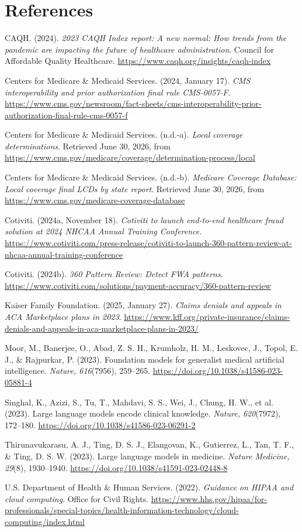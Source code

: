 \documentclass[11pt]{article}
\newcommand{\APARef}[1]{%
\hangindent=0.5in
\hangafter=1
#1\par
}
\begin{document}
\section*{References}
\APARef{
CAQH. (2024). \textit{2023 CAQH Index report: A new normal: How trends from the pandemic are impacting the future of healthcare administration}. Council for Affordable Quality Healthcare. \url{https://www.caqh.org/insights/caqh-index}
}
\APARef{
Centers for Medicare \& Medicaid Services. (2024, January 17). \textit{CMS interoperability and prior authorization final rule CMS-0057-F}. \url{https://www.cms.gov/newsroom/fact-sheets/cms-interoperability-prior-authorization-final-rule-cms-0057-f}
}
\APARef{
Centers for Medicare \& Medicaid Services. (n.d.-a). \textit{Local coverage determinations}. Retrieved June 30, 2026, from \url{https://www.cms.gov/medicare/coverage/determination-process/local}
}
\APARef{
Centers for Medicare \& Medicaid Services. (n.d.-b). \textit{Medicare Coverage Database: Local coverage final LCDs by state report}. Retrieved June 30, 2026, from \url{https://www.cms.gov/medicare-coverage-database}
}
\APARef{
Cotiviti. (2024a, November 18). \textit{Cotiviti to launch end-to-end healthcare fraud solution at 2024 NHCAA Annual Training Conference}. \url{https://www.cotiviti.com/press-release/cotiviti-to-launch-360-pattern-review-at-nhcaa-annual-training-conference}
}
\APARef{
Cotiviti. (2024b). \textit{360 Pattern Review: Detect FWA patterns}. \url{https://www.cotiviti.com/solutions/payment-accuracy/360-pattern-review}
}
\APARef{
Kaiser Family Foundation. (2025, January 27). \textit{Claims denials and appeals in ACA Marketplace plans in 2023}. \url{https://www.kff.org/private-insurance/claims-denials-and-appeals-in-aca-marketplace-plans-in-2023/}
}
\APARef{
Moor, M., Banerjee, O., Abad, Z. S. H., Krumholz, H. M., Leskovec, J., Topol, E. J., \& Rajpurkar, P. (2023). Foundation models for generalist medical artificial intelligence. \textit{Nature, 616}(7956), 259--265. \url{https://doi.org/10.1038/s41586-023-05881-4}
}
\APARef{
Singhal, K., Azizi, S., Tu, T., Mahdavi, S. S., Wei, J., Chung, H. W., et al. (2023). Large language models encode clinical knowledge. \textit{Nature, 620}(7972), 172--180. \url{https://doi.org/10.1038/s41586-023-06291-2}
}
\APARef{
Thirunavukarasu, A. J., Ting, D. S. J., Elangovan, K., Gutierrez, L., Tan, T. F., \& Ting, D. S. W. (2023). Large language models in medicine. \textit{Nature Medicine, 29}(8), 1930--1940. \url{https://doi.org/10.1038/s41591-023-02448-8}
}
\APARef{
U.S. Department of Health \& Human Services. (2022). \textit{Guidance on HIPAA and cloud computing}. Office for Civil Rights. \url{https://www.hhs.gov/hipaa/for-professionals/special-topics/health-information-technology/cloud-computing/index.html}
}
\end{document}
